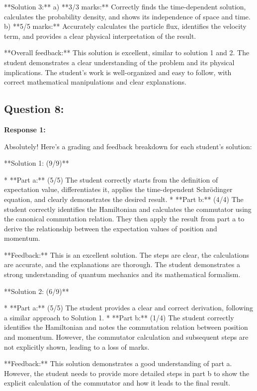 \documentclass[a4paper,11pt]{article}
\begin{document}
**Solution 3:**
a) **3/3 marks:** Correctly finds the time-dependent solution, calculates the probability density, and shows its independence of space and time.
b) **5/5 marks:** Accurately calculates the particle flux, identifies the velocity term, and provides a clear physical interpretation of the result.

**Overall feedback:** This solution is excellent, similar to solution 1 and 2. The student demonstrates a clear understanding of the problem and its physical implications. The student's work is well-organized and easy to follow, with correct mathematical manipulations and clear explanations.




\subsection*{Question 8:}

\textbf{Response 1:}

Absolutely! Here's a grading and feedback breakdown for each student's solution:

**Solution 1: (9/9)**

*   **Part a:** (5/5) The student correctly starts from the definition of expectation value, differentiates it, applies the time-dependent Schrödinger equation, and clearly demonstrates the desired result.
*   **Part b:** (4/4) The student correctly identifies the Hamiltonian and calculates the commutator using the canonical commutation relation. They then apply the result from part a to derive the relationship between the expectation values of position and momentum.

**Feedback:** This is an excellent solution. The steps are clear, the calculations are accurate, and the explanations are thorough. The student demonstrates a strong understanding of quantum mechanics and its mathematical formalism.

**Solution 2: (6/9)**

*   **Part a:** (5/5) The student provides a clear and correct derivation, following a similar approach to Solution 1.
*   **Part b:** (1/4) The student correctly identifies the Hamiltonian and notes the commutation relation between position and momentum. However, the commutator calculation and subsequent steps are not explicitly shown, leading to a loss of marks.

**Feedback:** This solution demonstrates a good understanding of part a. However, the student needs to provide more detailed steps in part b to show the explicit calculation of the commutator and how it leads to the final result.
\end{document}
